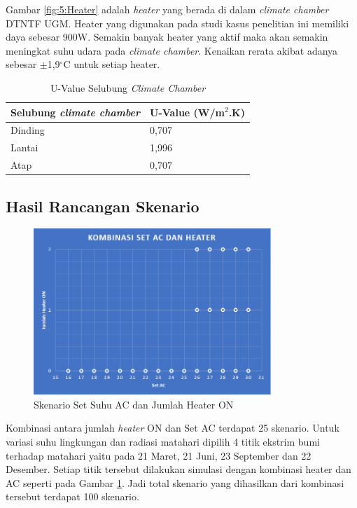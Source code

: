 Gambar \ref{fig:5:Heater} adalah \textit{heater} yang berada di dalam \textit{climate chamber} DTNTF UGM. Heater yang digunakan pada studi kasus penelitian ini memiliki daya sebesar 900W. Semakin banyak heater yang aktif maka akan semakin meningkat suhu udara pada \textit{climate chamber}. Kenaikan rerata akibat adanya sebesar $\pm$1,9$^{\circ}$C untuk setiap heater.

\begin{table}[hbt!]
	\caption{U-Value Selubung \textit{Climate Chamber}}
	\label{tbl:5:UValue}
	\centering
	\begin{tabular}{|l|l|}
		\hline
		\textbf{Selubung \textit{climate chamber}} & \textbf{U-Value (W/m$^2$.K)} \\ \hline
		Dinding & 0,707 \\ \hline
		Lantai  & 1,996 \\ \hline
		Atap    & 0,707 \\ \hline
	\end{tabular}
\end{table}

\subsection{Hasil Rancangan Skenario}
\begin{figure}[h]
	\centering
	\includegraphics[width=0.8\textwidth]{figures/HeaterAC}
	\caption{Skenario Set Suhu AC dan Jumlah Heater ON}
	\label{fig:5:HeaterAC}
\end{figure}
Kombinasi antara jumlah \textit{heater} ON dan Set AC terdapat 25 skenario. Untuk variasi suhu lingkungan dan radiasi matahari dipilih 4 titik ekstrim bumi terhadap matahari yaitu pada 21 Maret, 21 Juni, 23 September dan 22 Desember. Setiap titik tersebut dilakukan simulasi dengan kombinasi heater dan AC seperti pada Gambar \ref{fig:5:HeaterAC}. Jadi total skenario yang dihasilkan dari kombinasi tersebut terdapat 100 skenario.

